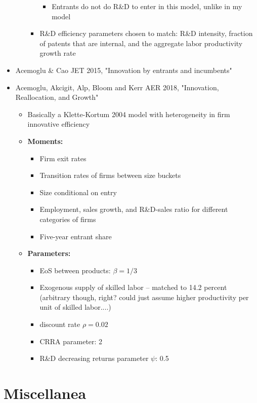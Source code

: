 \documentclass[12pt,english]{article}
\theoremstyle{remark}
\begin{document}
\begin{itemize}
\begin{itemize}
\begin{itemize}
			\begin{itemize}
				\item Entrants do not do R\&D to enter in this model, unlike in my model
			\end{itemize}
			\item R\&D efficiency parameters chosen to match: R\&D intensity, fraction of patents that are internal, and the aggregate labor productivity growth rate  
		\end{itemize}
	\end{itemize}
	\item Acemoglu \& Cao JET 2015, "Innovation by entrants and incumbents"
	\item Acemoglu, Akcigit, Alp, Bloom and Kerr AER 2018, "Innovation, Reallocation, and Growth"
	\begin{itemize}
		\item Basically a Klette-Kortum 2004 model with heterogeneity in firm innovative efficiency
		\item \textbf{Moments:}
		\begin{itemize}
			\item Firm exit rates
			\item Transition rates of firms between size buckets
			\item Size conditional on entry
			\item Employment, sales growth, and R\&D-sales ratio for different categories of firms
			\item Five-year entrant share
		\end{itemize}
		\item \textbf{Parameters:}
		\begin{itemize}
			\item EoS between products: $\beta = 1/3$
			\item Exogenous supply of skilled labor -- matched to 14.2 percent (arbitrary though, right? could just assume higher productivity per unit of skilled labor....)
			\item discount rate $\rho = 0.02$
			\item CRRA parameter: 2
			\item R\&D decreasing returns parameter $\psi$: 0.5
		\end{itemize}
	\end{itemize}
\end{itemize}



\section{Miscellanea}
\end{document}
